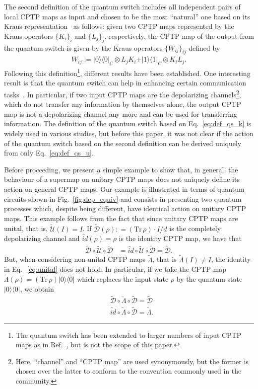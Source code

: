 \documentclass[a4paper,twocolumn,accepted=2022-10-23]{quantumarticle}
\newcommand{\proj}[1]{\vert {#1} \rangle\!\langle {#1} \vert}
\newcommand{\Tr}[0]{{\mathrm{Tr}}}
\newcommand{\tmap}[1]{\widetilde{\mbox{$\mathcal{#1}$}}}
\newcommand{\tmapf}[1]{\widetilde{\mbox{$#1$}}}
\theoremstyle{definition}
\begin{document}
The second definition of the quantum switch includes all independent pairs of local CPTP maps as input and chosen to be the most ``natural'' one based on its Kraus representation~\cite{kraus} as follows:
given two CPTP maps represented by the Kraus operators $\{ K_i \}_i $ and $\{ L_j \}_j $, respectively,
the CPTP map of the output from the quantum switch is given by the Kraus operators $\{ W_{ij} \}_{ij}$ defined by
\begin{align}
W_{ij} := \proj{0}_C \otimes L_j K_i + \proj{1}_C \otimes K_i L_j . \label{eq:def_qs_k}
\end{align}
Following this definition\footnote{The quantum switch has been extended to larger numbers of input CPTP maps as in Ref.~\cite{qs_discrimination2}, but is not the scope of this paper.}, different results have been established.
One interesting result is that the quantum switch can help in enhancing certain communication tasks~\cite{qs_comm1,qs_comm2,qs_comm3}.
In particular, if two input CPTP maps are the depolarizing channels\footnote{Here, ``channel'' and ``CPTP map'' are used synonymously, but the former is chosen over the latter to conform to the convention commonly used in the community.}, which do not transfer any information by themselves alone,
the output CPTP map is not a depolarizing channel any more and can be used for transferring information.
The definition of the quantum switch based on Eq.~\eqref{eq:def_qs_k} is widely used in various studies, but before this paper, it was not clear if the action of the quantum switch based on the second definition can be derived uniquely from only Eq.~\eqref{eq:def_qs_u}.

Before proceeding, we present a simple example to show that, in general, the behaviour of a supermap on unitary CPTP maps does not uniquely define its action on general CPTP maps. Our example is illustrated in terms of quantum circuits shown in Fig.~\ref{fig:dep_equiv} and consists in presenting two quantum processes which, despite being different, have identical action on unitary CPTP maps. This example follows from the fact that since unitary CPTP maps are unital, that is,  $\tmap{U}(I)=I$.
If $\tmap{D}(\rho): = (\Tr\, \rho) \cdot I /d $ is the completely depolarizing channel and $\tmapf{id}(\rho) = \rho$ is the identity CPTP map, we have that
	\begin{align} \label{eq:unital}
	\tmap{D}\circ \tmap{U} \circ \tmap{D} 	 &=\tmapf{id}\circ \tmap{U} \circ \tmap{D}  = \tmap{D}.
	\end{align}
But, when considering non-unital CPTP maps $\tmapf{\Lambda}$, that is $\tmapf{\Lambda}(I)\neq I$, the identity in Eq.~\,\eqref{eq:unital} does not hold. In particular, if we take the CPTP map $\tmapf{\Lambda}(\rho) = (\Tr\, \rho)\proj{0}$ which replaces the input state $\rho$ by the quantum state $\proj{0}$, we obtain
\begin{align} \label{eq:non_unital}
	&\tmap{D}\circ \tmapf{\Lambda} \circ \tmap{D} =	 \tmap{D} \\
	& \tmapf{id}\circ \tmapf{\Lambda} \circ \tmap{D} = \tmapf{\Lambda}.
	\end{align}
\end{document}
